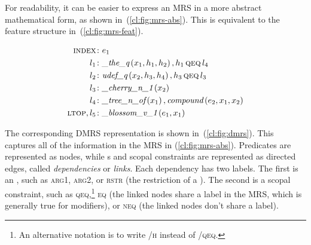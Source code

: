\documentclass[output=paper,biblatex,babelshorthands,newtxmath,draftmode,colorlinks,citecolor=brown]{langscibook}
\begin{document}
\noindent
For readability, it can be easier to express an MRS
in a more abstract mathematical form, as shown in~(\ref{cl:fig:mrs-abs}).
This is equivalent to the feature structure in~(\ref{cl:fig:mrs-feat}).

\begin{exe}
	\setlength{\abovedisplayskip}{1ex}
	\setlength{\belowdisplayskip}{1ex}
	\ex\label{cl:fig:mrs-abs}
	\begin{minipage}[c]{.6\textwidth}
	\vspace*{-1\baselineskip}
	\begin{align*}
	    \textsc{index}\colon & e_1 \\
		l_1\colon & \textit{\_the\_q}\left(x_1,h_1,h_2\right), h_1 \,\textsc{qeq}\, l_4 \\
		l_2\colon & \textit{udef\_q}\left(x_2,h_3,h_4\right), h_3 \,\textsc{qeq}\, l_3 \\
		l_3\colon & \textit{\_cherry\_n\_1}\left(x_2\right) \\
		l_4\colon & \textit{\_tree\_n\_of}\left(x_1\right), \textit{compound}\left(e_2,x_1,x_2\right) \\
		\textsc{ltop}, l_5\colon & \textit{\_blossom\_v\_1}\left(e_1,x_1\right)
	\end{align*}
	\end{minipage}
\end{exe}

The corresponding DMRS
representation is shown in~(\ref{cl:fig:dmrs}).
This captures all of the information
in the MRS in (\ref{cl:fig:mrs-abs}).
Predicates are represented as nodes,
while s and scopal constraints are represented as directed edges,
called \textit{dependencies} or \textit{links}.
Each dependency has two labels.
The first is an ,
such as \textsc{arg1}, \textsc{arg2},
or \textsc{rstr} (the restriction of a ).
The second is a scopal constraint,
such as \textsc{qeq},\footnote{%
	An alternative notation is to write
	\textsc{/h} instead of \textsc{/qeq}.
}
\textsc{eq} (the linked nodes share a label in the MRS,
which is generally true for modifiers),
or \textsc{neq} (the linked nodes don't share a label).
\end{document}
